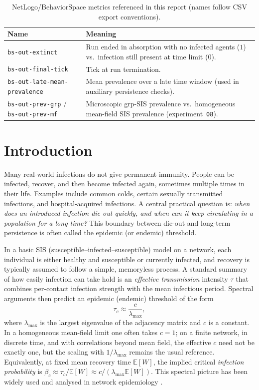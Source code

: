 \documentclass[11pt,a4paper]{article}
\begin{document}
\begin{table}[H]
  \centering
  \small
  \caption{NetLogo/BehaviorSpace metrics referenced in this report (names follow CSV export conventions).}
  \label{tab:netlogo-cols}
  \begin{tabularx}{\linewidth}{@{}l X@{}}
    \toprule
    \textbf{Name} & \textbf{Meaning} \\
    \midrule
    \texttt{bs-out-extinct} & Run ended in absorption with no infected agents ($1$) vs.\ infection still present at time limit ($0$). \\
    \texttt{bs-out-final-tick} & Tick at run termination. \\
    \texttt{bs-out-late-mean-prevalence} & Mean prevalence over a late time window (used in auxiliary persistence checks). \\
    \texttt{bs-out-prev-grp} / \texttt{bs-out-prev-mf} & Microscopic grp-SIS prevalence vs.\ homogeneous mean-field SIS prevalence (experiment~\texttt{08}). \\
    \bottomrule
  \end{tabularx}
\end{table}

\section{Introduction}

Many real-world infections do not give permanent immunity. People can be infected, recover, and then become infected again, sometimes multiple times in their life. Examples include common colds, certain sexually transmitted infections, and hospital-acquired infections. A central practical question is: \emph{when does an introduced infection die out quickly, and when can it keep circulating in a population for a long time?} This boundary between die-out and long-term persistence is often called the epidemic (or endemic) threshold.

In a basic SIS (susceptible--infected--susceptible) model on a network, each individual is either healthy and susceptible or currently infected, and recovery is typically assumed to follow a simple, memoryless process. A standard summary of how easily infection can take hold is an \emph{effective transmission} intensity $\tau$ that combines per-contact infection strength with the mean infectious period. Spectral arguments then predict an epidemic (endemic) threshold of the form
\[
  \tau_c \approx \frac{c}{\lambda_{\max}},
\]
where $\lambda_{\max}$ is the largest eigenvalue of the adjacency matrix and $c$ is a constant. In a homogeneous mean-field limit one often takes $c=1$; on a finite network, in discrete time, and with correlations beyond mean field, the effective $c$ need not be exactly one, but the scaling with $1/\lambda_{\max}$ remains the usual reference. Equivalently, at fixed mean recovery time $\mathbb{E}[W]$, the implied critical \emph{infection probability} is $\beta_c \approx \tau_c/\mathbb{E}[W] \approx c/(\lambda_{\max}\mathbb{E}[W])$. This spectral picture has been widely used and analysed in network epidemiology \cite{Chakrabarti2008,VanMieghem2011,PastorSatorras2015}.
\end{document}
